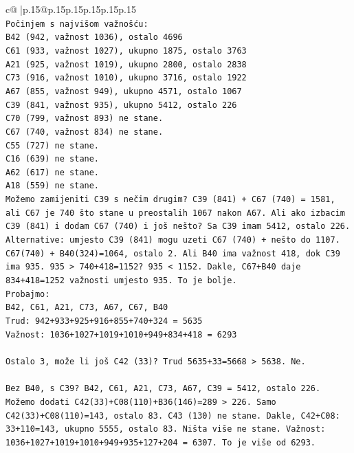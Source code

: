 \documentclass{article}
\begin{document}
{\begin{supertabular}{c@{$\;$}|p{.15\linewidth}@{}p{.15\linewidth}p{.15\linewidth}p{.15\linewidth}p{.15\linewidth}p{.15\linewidth}}
{{{\\ 
\texttt{Počinjem s najvišom važnošću:} \\
\texttt{B42 (942, važnost 1036), ostalo 4696} \\
\texttt{C61 (933, važnost 1027), ukupno 1875, ostalo 3763} \\
\texttt{A21 (925, važnost 1019), ukupno 2800, ostalo 2838} \\
\texttt{C73 (916, važnost 1010), ukupno 3716, ostalo 1922} \\
\texttt{A67 (855, važnost 949), ukupno 4571, ostalo 1067} \\
\texttt{C39 (841, važnost 935), ukupno 5412, ostalo 226} \\
\texttt{C70 (799, važnost 893) ne stane.} \\
\texttt{C67 (740, važnost 834) ne stane.} \\
\texttt{C55 (727) ne stane.} \\
\texttt{C16 (639) ne stane.} \\
\texttt{A62 (617) ne stane.} \\
\texttt{A18 (559) ne stane.} \\
\texttt{Možemo zamijeniti C39 s nečim drugim? C39 (841) + C67 (740) = 1581, ali C67 je 740 što stane u preostalih 1067 nakon A67. Ali ako izbacim C39 (841) i dodam C67 (740) i još nešto? Sa C39 imam 5412, ostalo 226.} \\
\texttt{Alternative: umjesto C39 (841) mogu uzeti C67 (740) + nešto do 1107. C67(740) + B40(324)=1064, ostalo 2. Ali B40 ima važnost 418, dok C39 ima 935. 935 > 740+418=1152? 935 < 1152. Dakle, C67+B40 daje 834+418=1252 važnosti umjesto 935. To je bolje.} \\
\texttt{Probajmo:} \\
\texttt{B42, C61, A21, C73, A67, C67, B40} \\
\texttt{Trud: 942+933+925+916+855+740+324 = 5635} \\
\texttt{Važnost: 1036+1027+1019+1010+949+834+418 = 6293} \\
\\ 
\texttt{Ostalo 3, može li još C42 (33)? Trud 5635+33=5668 > 5638. Ne.} \\
\\ 
\texttt{Bez B40, s C39? B42, C61, A21, C73, A67, C39 = 5412, ostalo 226. Možemo dodati C42(33)+C08(110)+B36(146)=289 > 226. Samo C42(33)+C08(110)=143, ostalo 83. C43 (130) ne stane. Dakle, C42+C08: 33+110=143, ukupno 5555, ostalo 83. Ništa više ne stane. Važnost: 1036+1027+1019+1010+949+935+127+204 = 6307. To je više od 6293.} \\
}}}
\end{supertabular}}
\end{document}
